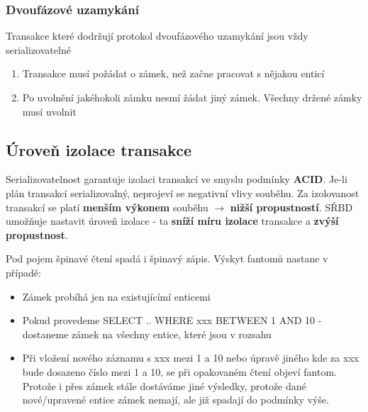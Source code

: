 \subsubsection{Dvoufázové uzamykání}
Transakce které dodržují protokol dvoufázového uzamykání jsou vždy serializovatelné
\begin{enumerate}
	\item Transakce musí požádat o zámek, než začne pracovat s nějakou enticí
	\item Po uvolnění jakéhokoli zámku nesmí žádat jiný zámek. Všechny držené zámky musí uvolnit
\end{enumerate}


\subsection{Úroveň izolace transakce}
Serializovatelnost garantuje izolaci transakcí ve smyslu podmínky \textbf{ACID}. Je-li plán transakcí serializovalný, neprojeví se negativní vlivy souběhu. Za izolovanost transakcí se platí \textbf{menším výkonem} souběhu $\rightarrow$ \textbf{nižší propustností}. SŘBD umožňuje nastavit úroveň izolace - ta \textbf{sníží míru izolace} transakce a \textbf{zvýší propustnost}.

Pod pojem špinavé čtení spadá i špinavý zápis. Výskyt fantomů nastane v případě:
\begin{itemize}
	\item Zámek probíhá jen na existujícímí enticemi
	\item Pokud provedeme SELECT .. WHERE xxx BETWEEN 1 AND 10 - dostaneme zámek na všechny entice, které jsou v rozsahu
	\item Při vložení nového záznamu s xxx mezi 1 a 10 nebo úpravě jiného kde za xxx bude dosazeno číslo mezi 1 a 10, se při opakovaném čtení objeví fantom. Protože i přes zámek stále dostáváme jiné výsledky, protože dané nové/upravené entice zámek nemají, ale již spadají do podmínky výše.
\end{itemize}
\\\\
\noindent{}